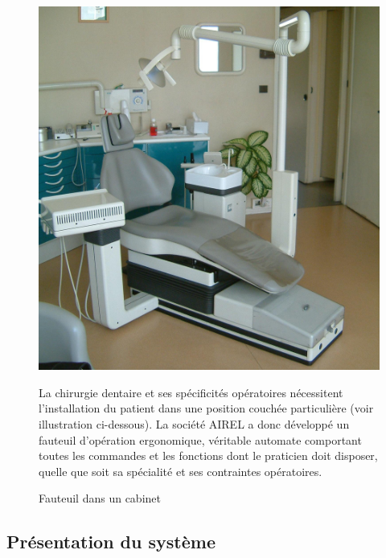 \begin{figure}[htbp]
\begin{minipage}[c]{.4\linewidth}
\begin{center}
\includegraphics[width=\linewidth]{img/cabinet.jpg}
\caption{Fauteuil dans un cabinet}
\label{fig:image1}
\end{center}
\end{minipage}
\hfill
\begin{minipage}[c]{.55\linewidth}
La chirurgie dentaire et ses spécificités opératoires nécessitent l'installation du patient dans une position couchée particulière (voir illustration ci-dessous). La société AIREL a donc développé un fauteuil d'opération ergonomique, véritable automate comportant toutes les commandes et les fonctions dont le praticien doit disposer, quelle que soit sa spécialité et ses contraintes opératoires.
\end{minipage}
\end{figure}

\subsection{Présentation du système}

